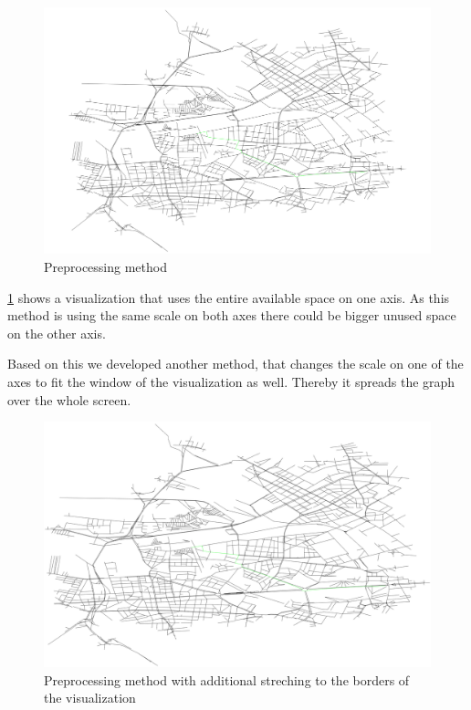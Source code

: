 \documentclass
[
    paper = a4,
    pagesize,
    12 pt,
    oneside,                       %
    open = right,
    DIV = calc,
    BCOR = 0 mm,                   %
    bibtotoc
]
{scrbook}
\begin{document}
\begin{figure}[H]
    \includegraphics[width=\textwidth]{Images/vis-preprocessing.png}
\caption[]{Preprocessing method}
\label{fig:preprocessing}
\end{figure}

\cref{fig:preprocessing} shows a visualization that uses the entire available space on one axis.
As this method is using the same scale on both axes there could be bigger unused space on the other axis.

Based on this we developed another method, that changes the scale on one of the axes to fit the window of the visualization as well.
Thereby it spreads the graph over the whole screen.

\begin{figure}[H]
    \includegraphics[width=\textwidth]{Images/vis-preprocessing-streched.png}
\caption[]{Preprocessing method with additional streching to the borders of the visualization}
\label{fig:spreaded_axis}
\end{figure}
\end{document}

